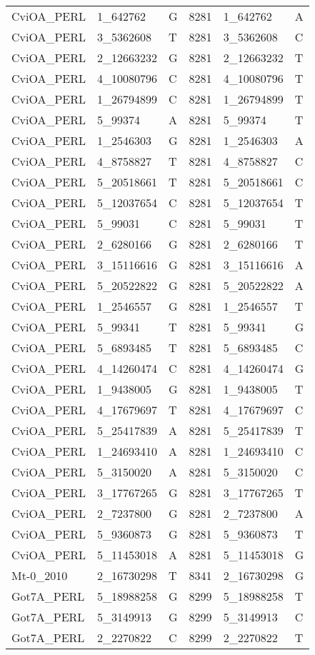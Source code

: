 \begin{center}
\begin{longtable}{|l|l|l|l|l|l|}
CviOA\_PERL&1\_642762&G&8281&1\_642762&A\\
CviOA\_PERL&3\_5362608&T&8281&3\_5362608&C\\
CviOA\_PERL&2\_12663232&G&8281&2\_12663232&T\\
CviOA\_PERL&4\_10080796&C&8281&4\_10080796&T\\
CviOA\_PERL&1\_26794899&C&8281&1\_26794899&T\\
CviOA\_PERL&5\_99374&A&8281&5\_99374&T\\
CviOA\_PERL&1\_2546303&G&8281&1\_2546303&A\\
CviOA\_PERL&4\_8758827&T&8281&4\_8758827&C\\
CviOA\_PERL&5\_20518661&T&8281&5\_20518661&C\\
CviOA\_PERL&5\_12037654&C&8281&5\_12037654&T\\
CviOA\_PERL&5\_99031&C&8281&5\_99031&T\\
CviOA\_PERL&2\_6280166&G&8281&2\_6280166&T\\
CviOA\_PERL&3\_15116616&G&8281&3\_15116616&A\\
CviOA\_PERL&5\_20522822&G&8281&5\_20522822&A\\
CviOA\_PERL&1\_2546557&G&8281&1\_2546557&T\\
CviOA\_PERL&5\_99341&T&8281&5\_99341&G\\
CviOA\_PERL&5\_6893485&T&8281&5\_6893485&C\\
CviOA\_PERL&4\_14260474&C&8281&4\_14260474&G\\
CviOA\_PERL&1\_9438005&G&8281&1\_9438005&T\\
CviOA\_PERL&4\_17679697&T&8281&4\_17679697&C\\
CviOA\_PERL&5\_25417839&A&8281&5\_25417839&T\\
CviOA\_PERL&1\_24693410&A&8281&1\_24693410&C\\
CviOA\_PERL&5\_3150020&A&8281&5\_3150020&C\\
CviOA\_PERL&3\_17767265&G&8281&3\_17767265&T\\
CviOA\_PERL&2\_7237800&G&8281&2\_7237800&A\\
CviOA\_PERL&5\_9360873&G&8281&5\_9360873&T\\
CviOA\_PERL&5\_11453018&A&8281&5\_11453018&G\\
Mt-0\_2010&2\_16730298&T&8341&2\_16730298&G\\
Got7A\_PERL&5\_18988258&G&8299&5\_18988258&T\\
Got7A\_PERL&5\_3149913&G&8299&5\_3149913&C\\
Got7A\_PERL&2\_2270822&C&8299&2\_2270822&T\\

\end{longtable}
\end{center}
